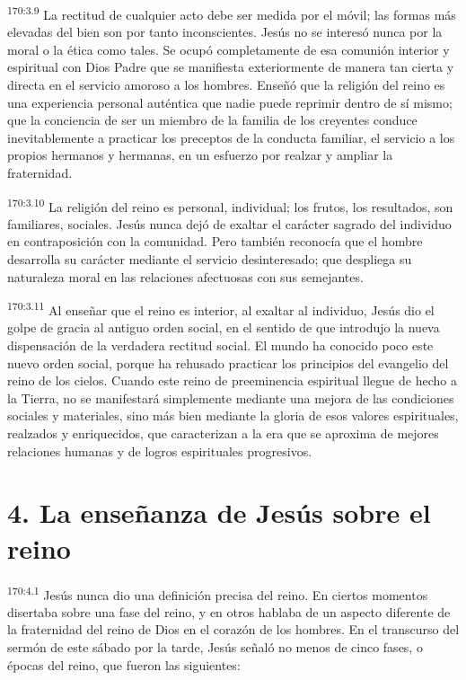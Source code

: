 \par 
\textsuperscript{170:3.9} La rectitud de cualquier acto debe ser medida por el móvil; las formas más elevadas del bien son por tanto inconscientes. Jesús no se interesó nunca por la moral o la ética como tales. Se ocupó completamente de esa comunión interior y espiritual con Dios Padre que se manifiesta exteriormente de manera tan cierta y directa en el servicio amoroso a los hombres. Enseñó que la religión del reino es una experiencia personal auténtica que nadie puede reprimir dentro de sí mismo; que la conciencia de ser un miembro de la familia de los creyentes conduce inevitablemente a practicar los preceptos de la conducta familiar, el servicio a los propios hermanos y hermanas, en un esfuerzo por realzar y ampliar la fraternidad.

\par 
\textsuperscript{170:3.10} La religión del reino es personal, individual; los frutos, los resultados, son familiares, sociales. Jesús nunca dejó de exaltar el carácter sagrado del individuo en contraposición con la comunidad. Pero también reconocía que el hombre desarrolla su carácter mediante el servicio desinteresado; que despliega su naturaleza moral en las relaciones afectuosas con sus semejantes.

\par 
\textsuperscript{170:3.11} Al enseñar que el reino es interior, al exaltar al individuo, Jesús dio el golpe de gracia al antiguo orden social, en el sentido de que introdujo la nueva dispensación de la verdadera rectitud social. El mundo ha conocido poco este nuevo orden social, porque ha rehusado practicar los principios del evangelio del reino de los cielos. Cuando este reino de preeminencia espiritual llegue de hecho a la Tierra, no se manifestará simplemente mediante una mejora de las condiciones sociales y materiales, sino más bien mediante la gloria de esos valores espirituales, realzados y enriquecidos, que caracterizan a la era que se aproxima de mejores relaciones humanas y de logros espirituales progresivos.

\section*{4. La enseñanza de Jesús sobre el reino}
\par 
\textsuperscript{170:4.1} Jesús nunca dio una definición precisa del reino. En ciertos momentos disertaba sobre una fase del reino, y en otros hablaba de un aspecto diferente de la fraternidad del reino de Dios en el corazón de los hombres. En el transcurso del sermón de este sábado por la tarde, Jesús señaló no menos de cinco fases, o épocas del reino, que fueron las siguientes:

